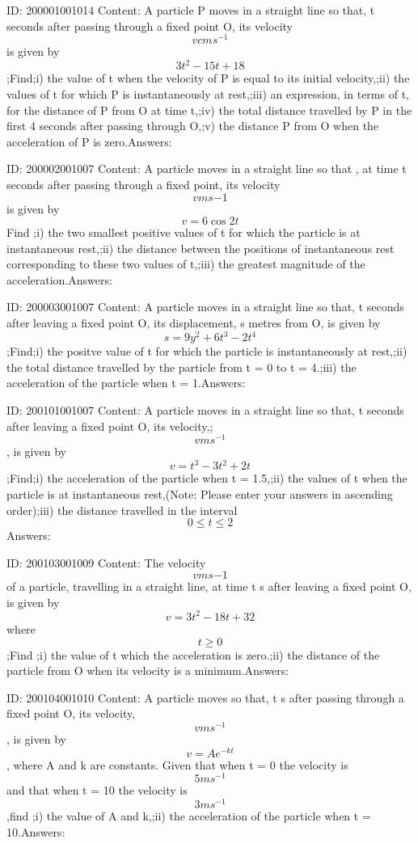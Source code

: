 \documentclass{article}
\begin{document}
ID: 200001001014
Content:
A particle P moves in a straight line so that, t seconds after passing through a fixed point O, its velocity \[vcms^{-1}\] is given by \[3t^2-15t+18\];Find;i) the value of t when the velocity of P is equal to its initial velocity,;ii) the values of t for which P is instantaneously at rest,;iii) an expression, in terms of t, for the distance of P from O at time t,;iv) the total distance travelled by P in the first 4 seconds after passing through O,;v) the distance P from O when the acceleration of P is zero.Answers:

ID: 200002001007
Content:
A particle moves in a straight line so that , at time t seconds after passing through a fixed point, its velocity \[v m s{-1}\] is given by \[v = 6 \cos 2t\] Find ;i) the two smallest positive values of t for which  the particle is at instantaneous rest,;ii) the distance between the positions of instantaneous rest corresponding to these two values of t,;iii) the greatest magnitude of the acceleration.Answers:

ID: 200003001007
Content:
A particle moves in a straight line so that, t seconds after leaving a fixed point O, its displacement, s metres from O, is given by \[s=9y^2+6t^3-2t^4\];Find;i) the positve value of t for which the particle is instantaneously at rest,;ii) the total distance travelled by the particle from t = 0 to t = 4.;iii) the acceleration of the particle when t = 1.Answers:

ID: 200101001007
Content:
A particle moves in a straight line so that, t seconds after leaving a fixed point O, its velocity,; \[v ms^{-1}\], is given by \[v=t^3-3t^2+2t\];Find;i) the acceleration of the particle when t = 1.5,;ii) the values of t when the particle is at instantaneous rest,(Note: Please enter your answers in ascending order);iii) the distance travelled in the interval \[0\leq t\leq 2\]Answers:

ID: 200103001009
Content:
The velocity \[vms{-1}\] of a particle, travelling in a straight line, at time t s after leaving a fixed point O, is given by \[v=3t^2-18t+32\] where \[t\geq 0\];Find ;i) the value of t which the acceleration is zero.;ii) the distance of the particle from O when its velocity is a minimum.Answers:

ID: 200104001010
Content:
A particle moves so that, t s after passing through a fixed point O, its velocity, $$vms^{-1}$$, is given by $$v=Ae^{-kt}$$, where A and k are constants. Given that when t = 0 the velocity is $$5 ms^{-1}$$ and that when t = 10 the velocity is $$3ms^{-1}$$,find ;i) the value of A and k,;ii) the acceleration of the particle when t = 10.Answers:
\end{document}
